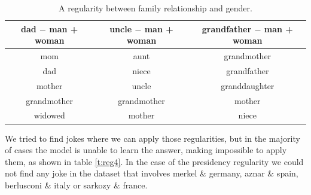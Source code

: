 \documentclass[]{article}
\begin{document}
	\begin{table}[H]
		\centering
		\begin{tabular}{@{}ccc@{}}
			\toprule
			dad $-$ man + woman & uncle $-$ man + woman & grandfather $-$ man + woman \\ \midrule
			mom             & aunt              & grandmother             \\
			dad             & niece             & grandfather             \\
			mother          & uncle             & granddaughter           \\
			grandmother     & grandmother       & mother                  \\
			widowed         & mother            & niece                   \\ \bottomrule
		\end{tabular}
		\caption{A regularity between family relationship and gender.}
		\label{t:reg3}
	\end{table}
	
	We tried to find jokes where we can apply those regularities, but in the majority of cases the model is unable to learn the answer, making impossible to apply them, as shown in table \ref{t:reg4}. In the case of the presidency regularity we could not find any joke in the dataset that involves merkel \& germany, aznar \& spain, berlusconi \& italy or sarkozy \& france.
	
\end{document}
